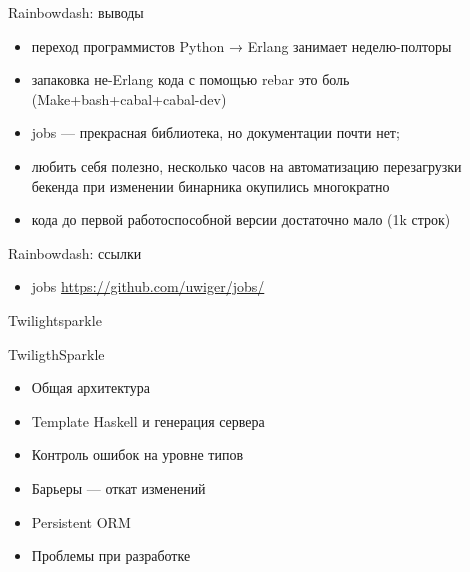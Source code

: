 \documentclass[10pt]{beamer}
\begin{document}
\begin{frame}{Rainbowdash: выводы}
  \begin{itemize}
  \item переход программистов Python → Erlang занимает неделю-полторы
  \item запаковка не-Erlang кода с помощью rebar это боль (Make+bash+cabal+cabal-dev)
  \item jobs — прекрасная библиотека, но документации почти нет;
  \item любить себя полезно, несколько часов на автоматизацию перезагрузки бекенда при изменении бинарника окупились многократно
  \item кода до первой работоспособной версии достаточно мало (1k строк)
  \end{itemize}
\end{frame}

\begin{frame}{Rainbowdash: ссылки}
  \begin{itemize}
  \item jobs \url{https://github.com/uwiger/jobs/}
  \end{itemize}
\end{frame}

\begin{frame}
  \begin{center}
    \Large
    Twilightsparkle
  \end{center}
\end{frame}

\begin{frame}{TwiligthSparkle}
\begin{itemize}
  \item Общая архитектура
  \item Template Haskell и генерация сервера
  \item Контроль ошибок на уровне типов
  \item Барьеры — откат изменений
  \item Persistent ORM
  \item Проблемы при разработке
\end{itemize}
\end{frame}
\end{document}
